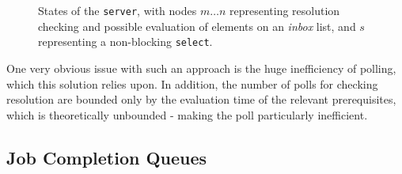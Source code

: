\begin{figure}
	\centering
	\caption{\label{fig:q-state}States of the \texttt{server}, with nodes
	\(m \dots n\) representing resolution checking and possible evaluation
	of elements on an \textit{inbox} list, and \(s\) representing a
	non-blocking \texttt{select}.}
\end{figure}

One very obvious issue with such an approach is the huge inefficiency of
polling, which this solution relies upon.
In addition, the number of polls for checking resolution are bounded only by
the evaluation time of the relevant prerequisites, which is theoretically
unbounded - making the poll particularly inefficient.

\subsection{Job Completion Queues}

